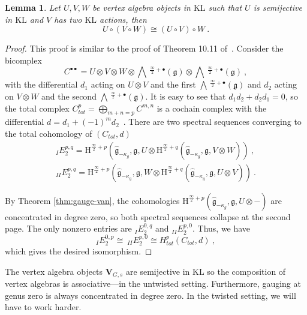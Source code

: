 \documentclass[a4paper]{article}
\newtheorem{lem}[thm]{Lemma}
\def\gf{\mathfrak{g}}
\def \KL{\mathrm{KL}}
\newcommand{\Hi}[1]{\mathrm{H}^{\frac{\infty}{2}+#1}}
\newcommand{\Li}[1]{\mathrm{\bigwedge}\,^{\frac{\infty}{2}+#1}}
\def\V{\mathbf{V}}
\begin{document}
\begin{lem}\label{lem:rearr_gauge}
Let $U,V,W$ be vertex algebra objects in $\KL$ such that $U$ is semijective in $\KL$ and $V$ has two $\KL$ actions, then
\begin{equation*}
	U\circ(V\circ W)\cong (U\circ V)\circ W~.
\end{equation*}
\end{lem}
\begin{proof}
This proof is similar to the proof of Theorem 10.11 of~\cite{Arakawa:2018egx}. Consider the bicomplex
\begin{equation*}
	C^{\bullet\bullet}= U\otimes V\otimes W\otimes \Li{\bullet}(\gf)\otimes\Li{\bullet}(\gf)~,
\end{equation*}
with the differential $d_1$ acting on $U\otimes V$ and the first $\Li{\bullet}(\gf)$ and $d_2$ acting on $V\otimes W$ and the second $\Li{\bullet}(\gf)$. It is easy to see that $d_1d_2+d_2d_1=0$, so the total complex $C_{tot}^p = \bigoplus_{m+n=p}C^{m,n}$ is a cochain complex with the differential $d = d_1 + (-1)^m d_2$~\cite{Weibel:1994}. There are two spectral sequences converging to the total cohomology of $(C_{tot},d)$
\begin{equation}\nonumber
	\begin{split}
	_IE^{p,q}_2 = \Hi{p}(\hat{\gf}_{-\kappa_g},\gf,U\otimes\Hi{q}(\hat{\gf}_{-\kappa_g},\gf,V\otimes W))~,\\
	_{II}E^{p,q}_2 = \Hi{p}(\hat{\gf}_{-\kappa_g},\gf,W\otimes\Hi{q}(\hat{\gf}_{-\kappa_g},\gf,U\otimes V))~.
	\end{split}
\end{equation}

By Theorem \ref{thm:gauge-van}, the cohomologies $\Hi{p}(\hat{\gf}_{-\kappa_g},\gf,U\otimes-)$ are concentrated in degree zero, so both spectral sequences collapse at the second page. The only nonzero entries are $_{I} E_2^{0,q}$ and $_{II}E_2^{p,0}$. Thus, we have
\begin{equation*}
	_IE^{0,p}_2\cong\ _{II}E^{p,0}_2 \cong H^p_{tot}(C_{tot},d)~,
\end{equation*}
which gives the desired isomorphism.
\end{proof}
\vspace{-6pt}

The vertex algebra objects $\V_{G,s}$ are semijective in $\KL$ so the composition of vertex algebras is associative---in the untwisted setting. Furthermore, gauging at genus zero is always concentrated in degree zero. In the twisted setting, we will have to work harder.
\end{document}
